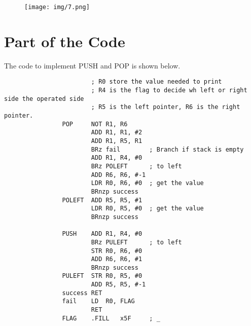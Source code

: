 \documentclass[20pt]{ctexart}
\begin{document}
    \begin{figure}[H]
        \texttt{[image: img/7.png]}
      \end{figure}

\section{Part of the Code}
The code to implement PUSH and POP is shown below.
\begin{verbatim}
                        ; R0 store the value needed to print
                        ; R4 is the flag to decide wh left or right side the operated side
                        ; R5 is the left pointer, R6 is the right pointer.
                POP     NOT R1, R6
                        ADD R1, R1, #2
                        ADD R1, R5, R1
                        BRz fail        ; Branch if stack is empty
                        ADD R1, R4, #0
                        BRz POLEFT      ; to left
                        ADD R6, R6, #-1
                        LDR R0, R6, #0  ; get the value
                        BRnzp success
                POLEFT  ADD R5, R5, #1
                        LDR R0, R5, #0  ; get the value
                        BRnzp success        

                PUSH    ADD R1, R4, #0
                        BRz PULEFT      ; to left
                        STR R0, R6, #0 
                        ADD R6, R6, #1 
                        BRnzp success
                PULEFT  STR R0, R5, #0 
                        ADD R5, R5, #-1 
                success RET
                fail    LD  R0, FLAG
                        RET
                FLAG    .FILL   x5F     ; _
        \end{verbatim}
\end{document}
